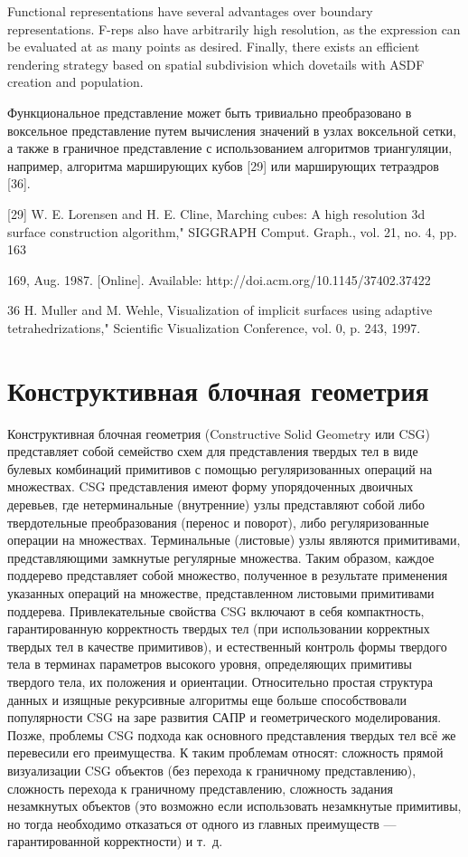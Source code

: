 {{{{{

Functional representations have several advantages over boundary representations.
F-reps also have arbitrarily high resolution, as the expression can be evaluated at as many
points as desired. Finally, there exists an efficient rendering strategy based on spatial
subdivision which dovetails with ASDF creation and population.

Функциональное представление может быть тривиально преобразовано в воксельное представление путем вычисления значений в узлах воксельной сетки, а также в граничное представление с использованием алгоритмов триангуляции, например, алгоритма марширующих кубов [29] или марширующих тетраэдров [36].

[29] W. E. Lorensen and H. E. Cline, Marching cubes: A high resolution 3d surface
construction algorithm," SIGGRAPH Comput. Graph., vol. 21, no. 4, pp. 163{
169, Aug. 1987. [Online]. Available: http://doi.acm.org/10.1145/37402.37422

36 H. Muller and M. Wehle, Visualization of implicit surfaces using adaptive tetrahedrizations," Scientific Visualization Conference, vol. 0, p. 243, 1997.

\section{Конструктивная блочная геометрия} \label{sect_csg}

Конструктивная блочная геометрия (Constructive Solid Geometry или CSG) представляет собой семейство схем для представления твердых тел в виде булевых комбинаций примитивов с помощью регуляризованных \cite{Requicha80} \cite{Requicha77} операций на множествах. CSG представления имеют форму упорядоченных двоичных деревьев, где нетерминальные (внутренние) узлы представляют собой либо твердотельные преобразования (перенос и поворот), либо регуляризованные операции на множествах. Терминальные (листовые) узлы являются примитивами, представляющими замкнутые регулярные множества. Таким образом, каждое поддерево представляет собой множество, полученное в результате применения указанных операций на множестве, представленном листовыми примитивами поддерева. Привлекательные свойства CSG включают в себя компактность, гарантированную корректность твердых тел (при использовании корректных твердых тел в качестве примитивов), и естественный контроль формы твердого тела в терминах параметров высокого уровня, определяющих примитивы твердого тела, их положения и ориентации. Относительно простая структура данных и изящные рекурсивные алгоритмы еще больше способствовали популярности CSG на заре развития САПР и геометрического моделирования. Позже, проблемы CSG подхода как основного представления твердых тел всё же перевесили его преимущества. К таким проблемам относят: сложность прямой визуализации CSG объектов (без перехода к граничному представлению), сложность перехода к граничному представлению, сложность задания незамкнутых объектов (это возможно если использовать незамкнутые примитивы, но тогда необходимо отказаться от одного из главных преимуществ — гарантированной корректности) и т. д.

}}}}}}
